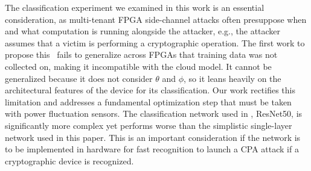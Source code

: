 The classification experiment we examined in this work is an essential consideration, as multi-tenant FPGA side-channel attacks often presuppose when and what computation is running alongside the attacker, e.g., the attacker assumes that a victim is performing a cryptographic operation. The first work to propose this~\cite{gobulukoglu2021dac} fails to generalize across FPGAs that training data was not collected on, making it incompatible with the cloud model. It cannot be generalized because it does not consider $\theta$ and $\phi$, so it leans heavily on the architectural features of the device for its classification. Our work rectifies this limitation and addresses a fundamental optimization step that must be taken with power fluctuation sensors. The classification network used in \cite{gobulukoglu2021dac}, ResNet50, is significantly more complex yet performs worse than the simplistic single-layer network used in this paper. This is an important consideration if the network is to be implemented in hardware for fast recognition to launch a CPA attack if a cryptographic device is recognized. 


